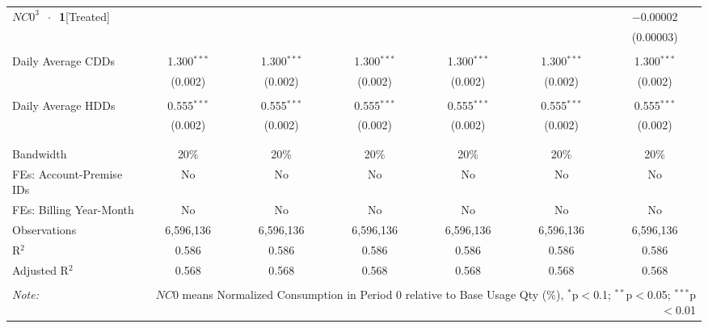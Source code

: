 \begin{table}[!htbp]
\begin{adjustbox}{scale = 0.8}
\begin{tabular}{@{\extracolsep{25pt}}lcccccc}
 $NC0^{3}$  $\ \cdot \ $ \textbf{1}[Treated] &  &  &  &  &  & $-$0.00002 \\ 
  &  &  &  &  &  & (0.00003) \\ 
  & & & & & & \\ 
 Daily Average CDDs & 1.300$^{***}$ & 1.300$^{***}$ & 1.300$^{***}$ & 1.300$^{***}$ & 1.300$^{***}$ & 1.300$^{***}$ \\ 
  & (0.002) & (0.002) & (0.002) & (0.002) & (0.002) & (0.002) \\ 
  & & & & & & \\ 
 Daily Average HDDs & 0.555$^{***}$ & 0.555$^{***}$ & 0.555$^{***}$ & 0.555$^{***}$ & 0.555$^{***}$ & 0.555$^{***}$ \\ 
  & (0.002) & (0.002) & (0.002) & (0.002) & (0.002) & (0.002) \\ 
  & & & & & & \\ 
\hline \\[-1.8ex] 
Bandwidth & 20\% & 20\% & 20\% & 20\% & 20\% & 20\% \\ 
FEs: Account-Premise IDs & No & No & No & No & No & No \\ 
FEs: Billing Year-Month & No & No & No & No & No & No \\ 
Observations & 6,596,136 & 6,596,136 & 6,596,136 & 6,596,136 & 6,596,136 & 6,596,136 \\ 
R$^{2}$ & 0.586 & 0.586 & 0.586 & 0.586 & 0.586 & 0.586 \\ 
Adjusted R$^{2}$ & 0.568 & 0.568 & 0.568 & 0.568 & 0.568 & 0.568 \\ 
\hline 
\hline \\[-1.8ex] 
\textit{Note:}  & \multicolumn{6}{r}{$NC0$ means Normalized Consumption in Period 0 relative to Base Usage Qty (\%), $^{*}$p$<$0.1; $^{**}$p$<$0.05; $^{***}$p$<$0.01} \\ 
\end{tabular} 
\end{adjustbox}
\end{table} 
